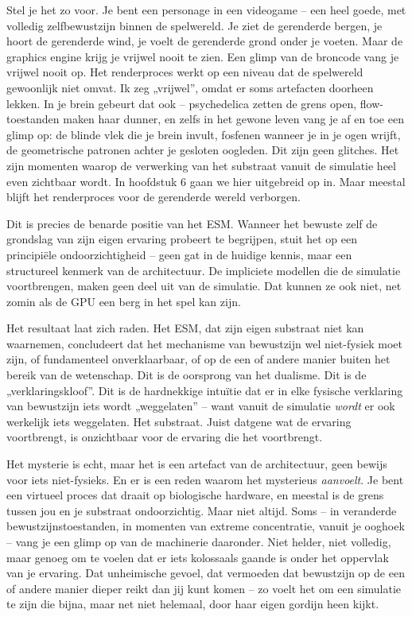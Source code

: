 \documentclass[11pt, twoside, openright]{book}
\begin{document}
Stel je het zo voor. Je bent een personage in een videogame -- een heel goede, met volledig zelfbewustzijn binnen de spelwereld. Je ziet de gerenderde bergen, je hoort de gerenderde wind, je voelt de gerenderde grond onder je voeten. Maar de graphics engine krijg je vrijwel nooit te zien. Een glimp van de broncode vang je vrijwel nooit op. Het renderproces werkt op een niveau dat de spelwereld gewoonlijk niet omvat. Ik zeg „vrijwel”, omdat er soms artefacten doorheen lekken. In je brein gebeurt dat ook -- psychedelica zetten de grens open, flow-toestanden maken haar dunner, en zelfs in het gewone leven vang je af en toe een glimp op: de blinde vlek die je brein invult, fosfenen wanneer je in je ogen wrijft, de geometrische patronen achter je gesloten oogleden. Dit zijn geen glitches. Het zijn momenten waarop de verwerking van het substraat vanuit de simulatie heel even zichtbaar wordt. In hoofdstuk 6 gaan we hier uitgebreid op in. Maar meestal blijft het renderproces voor de gerenderde wereld verborgen.

Dit is precies de benarde positie van het ESM. Wanneer het bewuste zelf de grondslag van zijn eigen ervaring probeert te begrijpen, stuit het op een principiële ondoorzichtigheid -- geen gat in de huidige kennis, maar een structureel kenmerk van de architectuur. De impliciete modellen die de simulatie voortbrengen, maken geen deel uit van de simulatie. Dat kunnen ze ook niet, net zomin als de GPU een berg in het spel kan zijn.

Het resultaat laat zich raden. Het ESM, dat zijn eigen substraat niet kan waarnemen, concludeert dat het mechanisme van bewustzijn wel niet-fysiek moet zijn, of fundamenteel onverklaarbaar, of op de een of andere manier buiten het bereik van de wetenschap. Dit is de oorsprong van het dualisme. Dit is de „verklaringskloof”. Dit is de hardnekkige intuïtie dat er in elke fysische verklaring van bewustzijn iets wordt „weggelaten” -- want vanuit de simulatie \textit{wordt} er ook werkelijk iets weggelaten. Het substraat. Juist datgene wat de ervaring voortbrengt, is onzichtbaar voor de ervaring die het voortbrengt.

Het mysterie is echt, maar het is een artefact van de architectuur, geen bewijs voor iets niet-fysieks. En er is een reden waarom het mysterieus \textit{aanvoelt}. Je bent een virtueel proces dat draait op biologische hardware, en meestal is de grens tussen jou en je substraat ondoorzichtig. Maar niet altijd. Soms -- in veranderde bewustzijnstoestanden, in momenten van extreme concentratie, vanuit je ooghoek -- vang je een glimp op van de machinerie daaronder. Niet helder, niet volledig, maar genoeg om te voelen dat er iets kolossaals gaande is onder het oppervlak van je ervaring. Dat unheimische gevoel, dat vermoeden dat bewustzijn op de een of andere manier dieper reikt dan jij kunt komen -- zo voelt het om een simulatie te zijn die bijna, maar net niet helemaal, door haar eigen gordijn heen kijkt.
\end{document}
